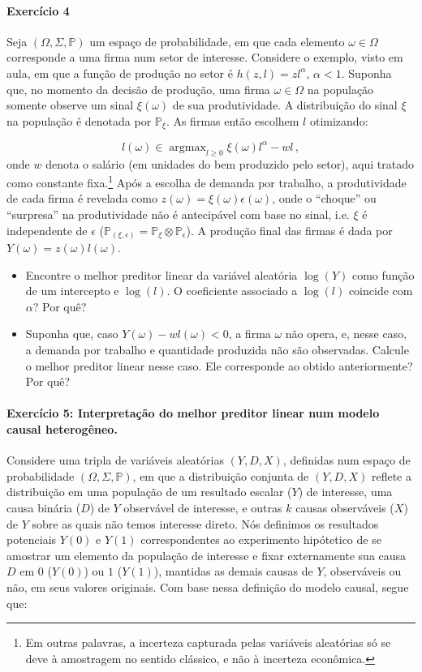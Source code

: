 \documentclass[10pt,a4paper]{article}
\begin{document}
 \paragraph{Exercício 4} Seja $(\Omega, \Sigma,\mathbb{P})$ um espaço de probabilidade, em que cada elemento $\omega \in \Omega$ corresponde a uma firma num setor de interesse. Considere o exemplo, visto em aula, em que a função de produção no setor é $h(z,l) = zl^{\alpha}$, $\alpha < 1$. Suponha que, no momento da decisão de produção, uma firma $\omega \in \Omega$ na população somente observe um sinal $\xi(\omega)$ de sua produtividade. A distribuição do sinal $\xi$ na população é denotada por $\mathbb{P}_\xi$. As firmas então escolhem $l$ otimizando:
 
 $$l(\omega) \in \operatorname{argmax}_{l \geq 0} \xi(\omega) l^{\alpha}- w l\, ,$$
onde $w$ denota o salário (em unidades do bem produzido pelo setor), aqui tratado como constante fixa.\footnote{Em outras palavras, a incerteza capturada pelas variáveis aleatórias só se deve à amostragem no sentido clássico, e não à incerteza econômica.} Após a escolha de demanda por trabalho, a produtividade de cada firma é revelada como $z(\omega) = \xi(\omega)\epsilon(\omega)$, onde o ``choque'' ou ``surpresa'' na produtividade  não é antecipável com base no sinal, i.e. $\xi$ é independente de $\epsilon$  ($\mathbb{P}_{(\xi,\epsilon)}  = \mathbb{P}_{\xi}\otimes \mathbb{P}_{\epsilon}$). A produção final das firmas é dada por $Y(\omega) = z(\omega) l(\omega)$.

\begin{itemize}
	\item[a] Encontre o melhor preditor linear da variável aleatória $\log(Y)$ como função de um intercepto e $\log(l)$. O coeficiente associado a $\log(l)$ coincide com $\alpha$? Por quê?
	\item[b] Suponha que, caso $Y(\omega) - wl(\omega)<0$, a firma $\omega$ não opera, e, nesse caso, a demanda por trabalho e quantidade produzida não são observadas. Calcule o melhor preditor linear nesse caso. Ele corresponde ao obtido anteriormente? Por quê?
\end{itemize}

	\paragraph{Exercício 5: Interpretação do melhor preditor linear num modelo causal heterogêneo.} Considere uma tripla de variáveis aleatórias $(Y,D,X)$, definidas num espaço de probabilidade  $(\Omega, \Sigma,\mathbb{P})$, em que a distribuição conjunta de $(Y,D,X)$ reflete a distribuição em uma população de um resultado escalar ($Y$) de interesse, uma causa binária ($D$) de $Y$ observável de interesse, e outras $k$ causas observáveis ($X$) de $Y$ sobre as quais não temos interesse direto. Nós definimos os resultados potenciais $Y(0)$ e $Y(1)$ correspondentes ao experimento hipótetico de se amostrar um elemento da população de interesse e fixar externamente sua causa $D$ em $0$ ($Y(0)$) ou $1$ ($Y(1)$), mantidas as demais causas de $Y$, observáveis ou não, em seus valores originais. Com base nessa definição do modelo causal, segue que: 
\end{document}
